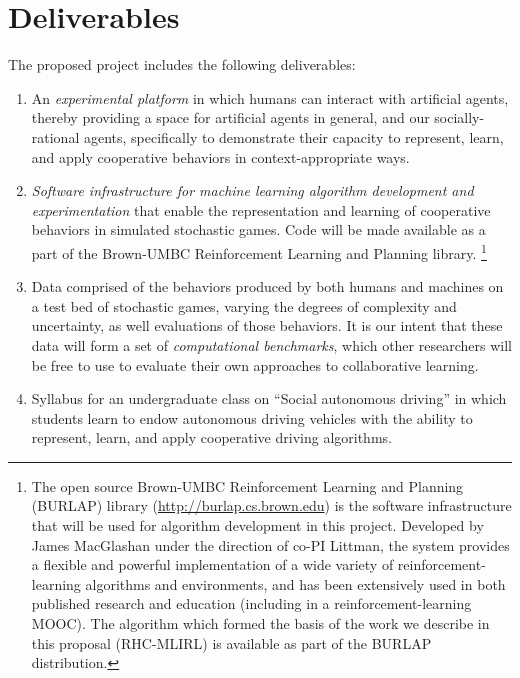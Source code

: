 
\section{Deliverables}

The proposed project includes the following deliverables: 

\begin{enumerate}

\item An {\em experimental platform\/} in which humans can interact
  with artificial agents, thereby providing a space for artificial
  agents in general, and our socially-rational agents, specifically to
  demonstrate their capacity to represent, learn, and apply
  cooperative behaviors in context-appropriate ways.

\item {\em Software infrastructure for machine learning algorithm
  development and experimentation\/} that enable the representation
  and learning of cooperative behaviors in simulated stochastic games.
  Code will be made available as a part of the Brown-UMBC
  Reinforcement Learning and Planning library.%
\footnote{The open source Brown-UMBC Reinforcement Learning and
  Planning (BURLAP) library (\url{http://burlap.cs.brown.edu}) is the
  software infrastructure that will be used for algorithm development
  in this project.  Developed by James MacGlashan under the direction
  of co-PI Littman, the system provides a flexible and powerful
  implementation of a wide variety of reinforcement-learning
  algorithms and environments, and has been extensively used in both
  published research and education (including in a
  reinforcement-learning MOOC).  The algorithm which formed the basis
  of the work we describe in this proposal (RHC-MLIRL) is available as
  part of the BURLAP distribution.}

\item Data comprised of the behaviors produced by both humans and
  machines on a test bed of stochastic games, varying the degrees of
  complexity and uncertainty, as well evaluations of those behaviors.
  It is our intent that these data will form a set of {\em
    computational benchmarks}, which other researchers will be free to
  use to evaluate their own approaches to collaborative learning.

\item Syllabus for an undergraduate class on ``Social autonomous
  driving'' in which students learn to endow autonomous driving
  vehicles with the ability to represent, learn, and apply cooperative
  driving algorithms.

\end{enumerate}

